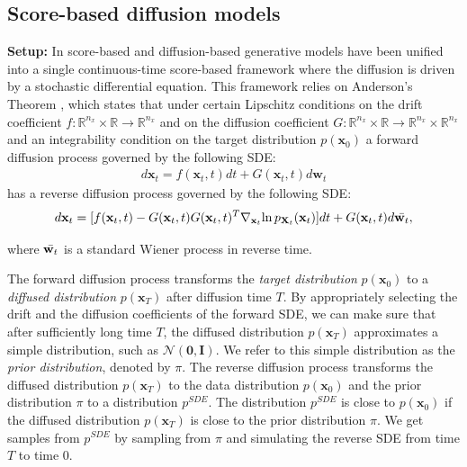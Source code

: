 \subsection{Score-based diffusion models}
\label{ch4:sec:background_score}

\textbf{Setup:} In \cite{song2020score} score-based  \cite{score_matching} and diffusion-based \cite{diffusion_models, ddpm} generative models have been unified into a single continuous-time score-based framework where the diffusion is driven by a stochastic differential equation.  This framework relies on Anderson's Theorem \cite{anderson1982reverse_time_sde}, which states that under certain Lipschitz conditions on the drift coefficient $f : \mathbb{R}^{n_x} \times \mathbb{R} \xrightarrow{} \mathbb{R}^{n_x}$ and on the diffusion coefficient $G : \mathbb{R}^{n_x} \times \mathbb{R}\xrightarrow{} \mathbb{R}^{n_x} \times \mathbb{R}^{n_x}$ and an integrability condition on the target distribution $p(\textbf{x}_0)$ a forward diffusion process governed by the following SDE:
\begin{gather}
\label{ch4:eq:forward_sde}
 d\textbf{x}_t = f(\textbf{x}_t,t)dt+G(\textbf{x}_t,t)d\textbf{w}_t  
\end{gather} 
has a reverse diffusion process governed by the following SDE:
\begin{gather}\label{ch4:eq:reverse_sde}
d\textbf{x}_t=[f(\textbf{x}_t,t)-G(\textbf{x}_t,t)G(\textbf{x}_t,t)^T\nabla_{\textbf{x}_t}{\ln{p_{\textbf{X}_t}(\textbf{x}_t)}}]dt + G(\textbf{x}_t,t)d\Bar{\textbf{w}_t},
\end{gather}

\noindent where $\Bar{\textbf{w}_t}$ is a standard Wiener process in reverse time. 

The forward diffusion process transforms the \textit{target distribution} $p(\textbf{x}_0)$ to a \textit{diffused distribution} $p(\textbf{x}_T)$ after diffusion time $T$. By appropriately selecting the drift and the diffusion coefficients of the forward SDE, we can make sure that after sufficiently long time $T$, the diffused distribution $p(\textbf{x}_T)$ approximates a simple distribution, such as $\mathcal{N}(\textbf{0},\textbf{I})$. We refer to this simple distribution as the \textit{prior distribution}, denoted by $\pi$. The reverse diffusion process transforms the diffused distribution $p(\textbf{x}_T)$ to the data distribution $p(\textbf{x}_0)$ and the prior distribution $\pi$ to a distribution $p^{SDE}$. The distribution $p^{SDE}$ is close to $p(\textbf{x}_0)$ if the diffused distribution $p(\textbf{x}_T)$ is close to the prior distribution $\pi$. We get samples from $p^{SDE}$ by sampling from $\pi$ and simulating the reverse SDE from time $T$ to time $0$.

